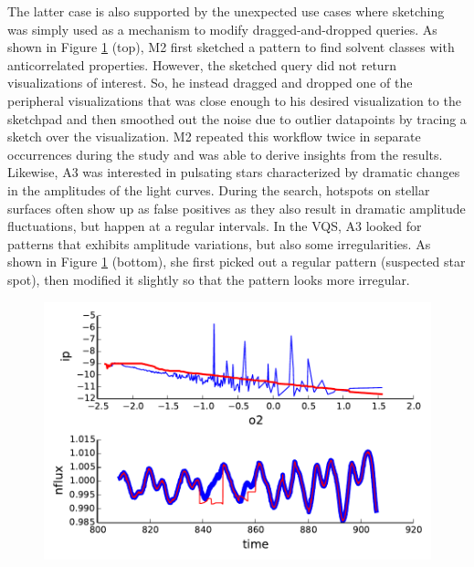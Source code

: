 \par The latter case is also supported by the unexpected use cases where sketching was simply used as a mechanism to modify dragged-and-dropped queries. As shown in Figure \ref{query_modification} (top), M2 first sketched a pattern to find solvent classes with anticorrelated properties. However, the sketched query did not return visualizations of interest. So, he instead dragged and dropped one of the peripheral visualizations that was close enough to his desired visualization to the sketchpad and then smoothed out the noise due to outlier datapoints by tracing a sketch over the visualization. M2 repeated this workflow twice in separate occurrences during the study and was able to derive insights from the results. Likewise, A3 was interested in pulsating stars characterized by dramatic changes in the amplitudes of the light curves. During the search, hotspots on stellar surfaces often show up as false positives as they also result in dramatic amplitude fluctuations, but happen at a regular intervals. In the VQS, A3 looked for patterns that exhibits amplitude variations, but also some irregularities. As shown in Figure \ref{query_modification} (bottom), she first picked out a regular pattern (suspected star spot), then modified it slightly so that the pattern looks more irregular.
\begin{figure}[ht!]
    \centering
    \includegraphics[width=\columnwidth]{figures/QueryModificationBySketch.pdf}
    \caption{
    \label{query_modification}}
    \vspace{-10pt}
\end{figure}
